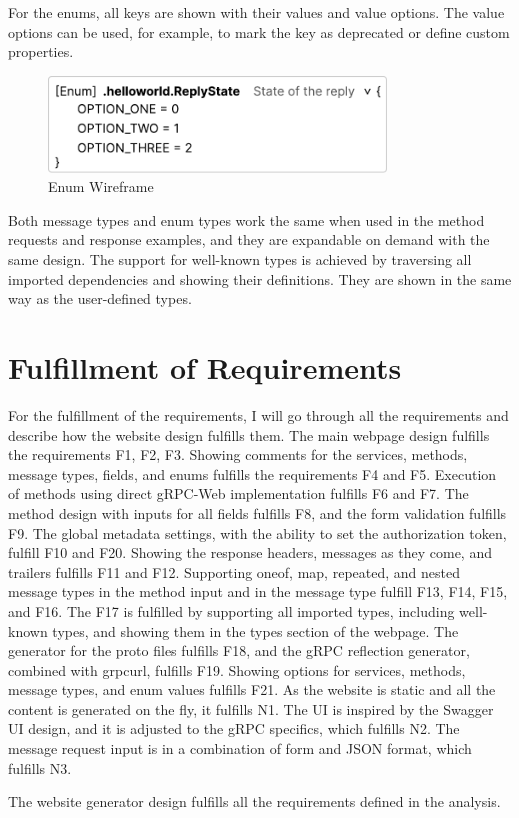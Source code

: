 For the enums, all keys are shown with their values and value options.
The value options can be used, for example, to mark the key as deprecated or define custom properties.

\begin{figure}[hbt!]
    \centering
    \captionsetup{justification=centering}
    \includegraphics[width=0.8\textwidth]{images/design/wireframes/enum}
    \caption{Enum Wireframe}
    \label{fig:wireframe-enum}
\end{figure}

Both message types and enum types work the same when used in the method requests and response examples, and they are expandable on demand with the same design.
The support for well-known types is achieved by traversing all imported dependencies and showing their definitions.
They are shown in the same way as the user-defined types.


\section{Fulfillment of Requirements}
For the fulfillment of the requirements, I will go through all the requirements and describe how the website design fulfills them.
The main webpage design fulfills the requirements F1, F2, F3.
Showing comments for the services, methods, message types, fields, and enums fulfills the requirements F4 and F5.
Execution of methods using direct gRPC-Web implementation fulfills F6 and F7.
The method design with inputs for all fields fulfills F8, and the form validation fulfills F9.
The global metadata settings, with the ability to set the authorization token, fulfill F10 and F20.
Showing the response headers, messages as they come, and trailers fulfills F11 and F12.
Supporting oneof, map, repeated, and nested message types in the method input and in the message type fulfill F13, F14, F15, and F16.
The F17 is fulfilled by supporting all imported types, including well-known types, and showing them in the types section of the webpage.
The generator for the proto files fulfills F18, and the gRPC reflection generator, combined with grpcurl, fulfills F19.
Showing options for services, methods, message types, and enum values fulfills F21.
As the website is static and all the content is generated on the fly, it fulfills N1.
The UI is inspired by the Swagger UI design, and it is adjusted to the gRPC specifics, which fulfills N2.
The message request input is in a combination of form and JSON format, which fulfills N3.

The website generator design fulfills all the requirements defined in the analysis.
